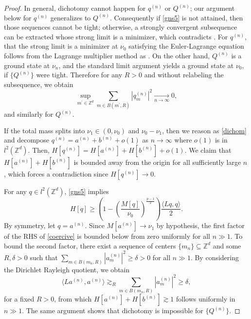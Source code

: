 \documentclass{article}
\numberwithin{equation}{section}
\begin{document}
\begin{proof}
In general, dichotomy cannot happen for $q^{(n)}$ or $Q^{(n)}$; our argument below for $q^{(n)}$ generalizes to $Q^{(n)}$.  Consequently if \eqref{gns5} is not attained, then those sequences cannot be tight; otherwise, a strongly convergent subsequence can be extracted whose strong limit is a minimizer, which contradicts . For $q^{(n)}$, that the strong limit is a minimizer at $\nu_0$ satisfying the Euler-Lagrange equation follows from the Lagrange multiplier method as . On the other hand, $Q^{(n)}$ is a ground state at $\nu_n$, and the standard limit argument yields a ground state at $\nu_0$, if $\{Q^{(n)}\}$ were tight. Therefore for any $R > 0$ and without relabeling the subsequence, we obtain
\begin{equation}\label{vanishing}
    \sup_{m^\prime \in \mathbb{Z}^d} \sum_{m \in B(m^\prime,R)} |q^{(n)}_m|^2 \xrightarrow[n \rightarrow \infty]{} 0,
\end{equation}
and similarly for $Q^{(n)}$.

If the total mass splits into $\nu_1 \in (0,\nu_0)$ and $\nu_0 - \nu_1$, then we reason as \eqref{dichom} and decompose $q^{(n)} = a^{(n)} + b^{(n)} + o(1)$ as $n \rightarrow \infty$ where $o(1)$ is in $l^2(\mathbb{Z}^d)$. Then, $H[q^{(n)}] = H[a^{(n)}] + H[b^{(n)}] + o(1)$. We claim that $H[a^{(n)}] + H[b^{(n)}]$ is bounded away from the origin for all sufficiently large $n$, which forces a contradiction since $H[q^{(n)}] \rightarrow 0$.

For any $q \in l^2(\mathbb{Z}^d)$, \eqref{gns5} implies
\begin{equation}\label{coercive}
    H[q] \geq \left(1-\left(\frac{M[q]}{\nu_0}\right)^{\frac{p-1}{2}}\right)\frac{\langle Lq,q \rangle}{2}.
\end{equation}
By symmetry, let $q = a^{(n)}$. Since $M[a^{(n)}] \rightarrow \nu_1$ by hypothesis, the first factor of the RHS of \eqref{coercive} is bounded below from zero uniformly for all $n \gg 1$. To bound the second factor, there exist a sequence of centers $\{m_n\} \subseteq \mathbb{Z}^d$ and some $R,\delta>0$ such that $\sum\limits_{m \in B(m_n,R)}|a^{(n)}_{m}|^2 \geq \delta > 0$ for all $n \gg 1$. By considering the Dirichlet Rayleigh quotient, we obtain
\begin{equation*}
\langle L a^{(n)},a^{(n)} \rangle \gtrsim_R \sum\limits_{m \in B(m_n,R)}|a^{(n)}_{m}|^2 \geq \delta,    
\end{equation*}
for a fixed $R>0$, from which $H[a^{(n)}] + H[b^{(n)}] \gtrsim 1$ follows uniformly in $n \gg 1$. The same argument shows that dichotomy is impossible for $\{Q^{(n)}\}$.


\end{proof}
\end{document}
